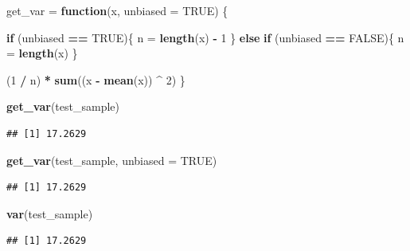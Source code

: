\documentclass[]{book}
\newenvironment{Shaded}{\begin{snugshade}}{\end{snugshade}}
\newcommand{\KeywordTok}[1]{\textcolor[rgb]{0.13,0.29,0.53}{\textbf{#1}}}
\newcommand{\DataTypeTok}[1]{\textcolor[rgb]{0.13,0.29,0.53}{#1}}
\newcommand{\DecValTok}[1]{\textcolor[rgb]{0.00,0.00,0.81}{#1}}
\newcommand{\StringTok}[1]{\textcolor[rgb]{0.31,0.60,0.02}{#1}}
\newcommand{\OtherTok}[1]{\textcolor[rgb]{0.56,0.35,0.01}{#1}}
\newcommand{\ControlFlowTok}[1]{\textcolor[rgb]{0.13,0.29,0.53}{\textbf{#1}}}
\newcommand{\OperatorTok}[1]{\textcolor[rgb]{0.81,0.36,0.00}{\textbf{#1}}}
\newcommand{\NormalTok}[1]{#1}
\begin{document}
\begin{Shaded}
\begin{Highlighting}[]
\NormalTok{get_var =}\StringTok{ }\ControlFlowTok{function}\NormalTok{(x, }\DataTypeTok{unbiased =} \OtherTok{TRUE}\NormalTok{) \{}

  \ControlFlowTok{if}\NormalTok{ (unbiased }\OperatorTok{==}\StringTok{ }\OtherTok{TRUE}\NormalTok{)\{}
\NormalTok{    n =}\StringTok{ }\KeywordTok{length}\NormalTok{(x) }\OperatorTok{-}\StringTok{ }\DecValTok{1}
\NormalTok{  \} }\ControlFlowTok{else} \ControlFlowTok{if}\NormalTok{ (unbiased }\OperatorTok{==}\StringTok{ }\OtherTok{FALSE}\NormalTok{)\{}
\NormalTok{    n =}\StringTok{ }\KeywordTok{length}\NormalTok{(x) }
\NormalTok{   \}}

\NormalTok{  (}\DecValTok{1} \OperatorTok{/}\StringTok{ }\NormalTok{n) }\OperatorTok{*}\StringTok{ }\KeywordTok{sum}\NormalTok{((x }\OperatorTok{-}\StringTok{ }\KeywordTok{mean}\NormalTok{(x)) }\OperatorTok{^}\StringTok{ }\DecValTok{2}\NormalTok{)}
\NormalTok{\}}
\end{Highlighting}
\end{Shaded}

\begin{Shaded}
\begin{Highlighting}[]
\KeywordTok{get_var}\NormalTok{(test_sample)}
\end{Highlighting}
\end{Shaded}

\begin{verbatim}
## [1] 17.2629
\end{verbatim}

\begin{Shaded}
\begin{Highlighting}[]
\KeywordTok{get_var}\NormalTok{(test_sample, }\DataTypeTok{unbiased =} \OtherTok{TRUE}\NormalTok{)}
\end{Highlighting}
\end{Shaded}

\begin{verbatim}
## [1] 17.2629
\end{verbatim}

\begin{Shaded}
\begin{Highlighting}[]
\KeywordTok{var}\NormalTok{(test_sample)}
\end{Highlighting}
\end{Shaded}

\begin{verbatim}
## [1] 17.2629
\end{verbatim}
\end{document}
